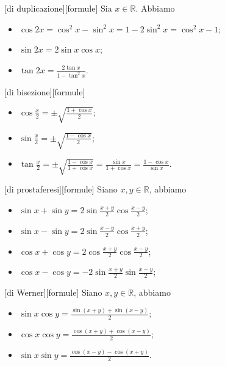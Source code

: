 \begin{Corollary}
  [di duplicazione][formule]
  Sia $x \in \mathbb{R}$. Abbiamo
  \begin{itemize}
    \item $\cos{2x}
            = \cos^2{x} - \sin^2{x}
            = 1 - 2 \sin^2{x}
            = \cos^2{x} - 1$;
    \item $\sin{2x} = 2 \sin{x} \cos{x}$;
    \item $\tan{2x} = \frac{2 \tan{x}}{1 - \tan^2{x}}$.
  \end{itemize}
\end{Corollary}
\begin{Corollary}
  [di bisezione][formule]
  \begin{itemize}
    \item $\cos{\frac{x}{2}}
            = \pm \sqrt{\frac{1 + \cos{x}}{2}}$;
    \item $\sin{\frac{x}{2}}
            = \pm \sqrt{\frac{1 - \cos{x}}{2}}$;
    \item $\tan{\frac{x}{2}}
            = \pm \sqrt
                {\frac{1 - \cos{x}}{1 + \cos{x}}}
            = \frac{\sin{x}}{1 + \cos{x}}
            = \frac{1 - \cos{x}}{\sin{x}}$.
  \end{itemize}
\end{Corollary}
\begin{Theorem}
  [di prostaferesi][formule]
  Siano $x, y \in \mathbb{R}$, abbiamo
  \begin{itemize}
    \item $\sin x + \sin y
            = 2 \sin \frac{x + y}{2} \cos \frac{x - y}{2}$;
    \item $\sin x - \sin y
            = 2 \sin \frac{x - y}{2} \cos \frac{x + y}{2}$;
    \item $\cos x + \cos y
            = 2 \cos \frac{x + y}{2} \cos \frac{x - y}{2}$;
    \item $\cos x - \cos y
            = - 2 \sin \frac{x + y}{2} \sin \frac{x - y}{2}$;
  \end{itemize}
\end{Theorem}
\begin{Theorem}
  [di Werner][formule]
  Siano $x, y \in \mathbb{R}$, abbiamo
  \begin{itemize}
    \item $\sin{x}\cos{y} = \frac{\sin(x + y) + \sin(x - y)}{2}$;
    \item $\cos{x}\cos{y} = \frac{\cos(x + y) + \cos(x - y)}{2}$;
    \item $\sin{x}\sin{y} = \frac{\cos(x - y) - \cos(x + y)}{2}$.
  \end{itemize}
\end{Theorem}
